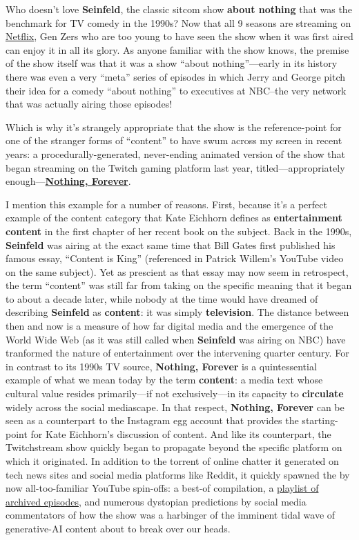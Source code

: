\documentclass[
  letterpaper,
  DIV=11,
  numbers=noendperiod,
  oneside]{scrartcl}
\begin{document}
Who doesn't love \textbf{Seinfeld}, the classic sitcom show
\textbf{about nothing} that was the benchmark for TV comedy in the
1990s? Now that all 9 seasons are streaming on
\href{https://www.netflix.com/title/70153373}{Netflix}, Gen Zers who are
too young to have seen the show when it was first aired can enjoy it in
all its glory. As anyone familiar with the show knows, the premise of
the show itself was that it was a show ``about nothing''---early in its
history there was even a very ``meta'' series of episodes in which Jerry
and George pitch their idea for a comedy ``about nothing'' to executives
at NBC--the very network that was actually airing those episodes!

Which is why it's strangely appropriate that the show is the
reference-point for one of the stranger forms of ``content'' to have
swum across my screen in recent years: a procedurally-generated,
never-ending animated version of the show that began streaming on the
Twitch gaming platform last year, titled---appropriately
enough---\href{https://www.twitch.tv/watchmeforever}{\textbf{Nothing,
Forever}}.

I mention this example for a number of reasons. First, because it's a
perfect example of the content category that Kate Eichhorn defines as
\textbf{entertainment content} in the first chapter of her recent book
on the subject. Back in the 1990s, \textbf{Seinfeld} was airing at the
exact same time that Bill Gates first published his famous essay,
``Content is King'' (referenced in Patrick Willem's YouTube video on the
same subject). Yet as prescient as that essay may now seem in
retrospect, the term ``content'' was still far from taking on the
specific meaning that it began to about a decade later, while nobody at
the time would have dreamed of describing \textbf{Seinfeld} as
\textbf{content}: it was simply \textbf{television}. The distance
between then and now is a measure of how far digital media and the
emergence of the World Wide Web (as it was still called when
\textbf{Seinfeld} was airing on NBC) have tranformed the nature of
entertainment over the intervening quarter century. For in contrast to
its 1990s TV source, \textbf{Nothing, Forever} is a quintessential
example of what we mean today by the term \textbf{content}: a media text
whose cultural value resides primarily---if not exclusively---in its
capacity to \textbf{circulate} widely across the social mediascape. In
that respect, \textbf{Nothing, Forever} can be seen as a counterpart to
the Instagram egg account that provides the starting-point for Kate
Eichhorn's discussion of content. And like its counterpart, the
Twitchstream show quickly began to propagate beyond the specific
platform on which it originated. In addition to the torrent of online
chatter it generated on tech news sites and social media platforms like
Reddit, it quickly spawned the by now all-too-familiar YouTube
spin-offs: a best-of compilation, a
\href{https://www.youtube.com/playlist?list=PLMWNMOWqRRvAiIIjXuxsxEpOXw3GV2b6G}{playlist
of archived episodes}, and numerous dystopian predictions by social
media commentators of how the show was a harbinger of the imminent tidal
wave of generative-AI content about to break over our heads.
\end{document}
